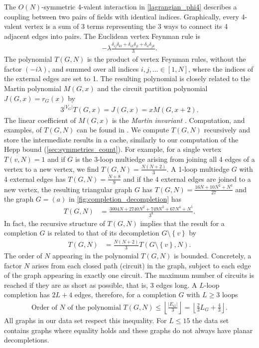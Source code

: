 \documentclass[11pt,a4paper]{article}
\newcommand{\abs}[1]{\lvert #1 \rvert}
\renewcommand{\|}{\rule[-0.4ex]{0.2ex}{1.2em}}
\begin{document}
The $O(N)$-symmetric 4-valent interaction in \cref{lagrangian_phi4} describes a coupling between two  pairs of fields with identical indices. Graphically, every 4-valent vertex is a sum of 3 terms representing the 3 ways to connect its 4 adjacent edges into pairs. The Euclidean vertex Feynman rule is
\begin{align*}
	- \lambda \frac{\delta_{ij}\delta_{kl} + \delta_{ik}\delta_{jl} + \delta_{il}\delta_{jk}}{3}.
\end{align*}
The polynomial $T(G,N)$ is the product of vertex Feynman rules, without the factor $(-i\lambda)$, and summed over all indices $  i,j,\ldots  \in [1,N]$, where the indices of the   external edges are set to 1. The resulting polynomial is closely related to the Martin polynomial $M(G,x)$ and the circuit partition polynomial $J(G,x)=r_G(x)$  \cite{martin_enumerations_1977,ellis-monaghan_new_1998,bollobas_evaluations_2002} by 
\begin{align}\label{circuit_martin}
3^{\abs{V_G}}  T(G,x)  = J(G,x)= xM(G,x+2).
\end{align}
The linear coefficient of $M(G,x)$ is the \emph{Martin invariant} \cite{bouchet_connectivity_1996,panzer_feynman_2023}. 
Computation, and examples, of $T(G,N)$ can be found in \cite{kleinert_critical_2001}.
We compute $T(G,N)$ recursively and store the intermediate results in a cache, similarly to our computation of the Hepp bound (\cref{sec:symmetries_count}).
For example, for a single vertex $T(v,N)=1$ and if $G$ is the 3-loop multiedge arising from joining all 4 edges of a vertex to a new vertex, we find $T(G,N)=\frac{N(N+2)}{3}$. A 1-loop multiedge $G$ with 4 external edges has $T(G,N)=\frac{N+8}{9}$ and if the 4 external edges are joined to a new vertex, the resulting triangular graph $G$ has $T(G,N)=\frac{16N+10N^2+N^3}{27}$ and the graph $G=(a)$ in \cref{fig:completion_decompletion} has 
\begin{align*}
	T\left( G,N \right) &=\frac{  3004 N + 2740 N^2 + 749 N^3 + 67 N^4 + N^5}{3^8}.
\end{align*}
In fact, the recursive structure of $T(G,N)$  implies that the result for a completion $G$ is related to that of its decompletion $G\setminus \left \lbrace v \right \rbrace $ by 
\begin{align}\label{TGN_decompletion}
T(G,N) &= \frac{N(N+2)}{3} T(G\setminus \left \lbrace v \right \rbrace , N ).
\end{align}
The order of $N$ appearing in the polynomial $T(G,N)$ is bounded. Concretely, a factor $N$ arises from each closed path (circuit) in the graph, subject to each edge of the graph appearing in exactly one circuit. The maximum number of circuits is reached if they are as short as possible,  that is, 3 edges long. A $L$-loop completion has $2L+4$ edges, therefore, for a completion $G$ with $L\geq 3$ loops
\begin{align}\label{TGN_bound}
\text{Order of } N \text{ of the polynomial } T(G,N)  \leq  \left \lfloor \frac{\abs{E_G}}{3}\right \rfloor  =\left \lfloor \frac{2}{3}L_G + \frac 4 3\right \rfloor.
\end{align}
All graphs in our data set respect this inequality. For   $L \leq 15$ the data set contains graphs where equality holds and these graphs do not always have planar decompletions. 
\end{document}
